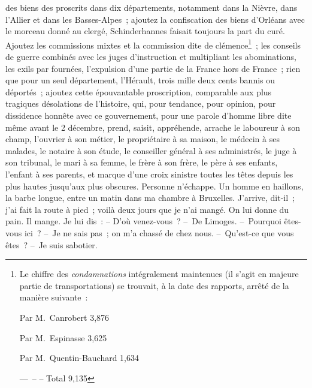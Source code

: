 \documentclass[french,twoside]{book} %
\begin{document}
{} des biens des proscrits dans dix départements, notamment dans la Nièvre, dans l’Allier et dans les Basses-Alpes ; ajoutez la confiscation des biens d’Orléans avec le morceau donné au clergé, Schinderhannes faisait toujours la part du curé. Ajoutez les commissions mixtes et la commission dite de clémence\footnote{ \noindent Le chiffre des \emph{condamnations} intégralement maintenues (il s’agit en majeure partie de transportations) se trouvait, à la date des rapports, arrêté de la manière suivante :\par
 Par M. Canrobert 3,876\par
 Par M. Espinasse 3,625\par
 Par M. Quentin-Bauchard 1,634\par
 — – – Total 9,135
} ; les conseils de guerre combinés avec les juges d’instruction et multipliant les abominations, les exils par fournées, l’expulsion d’une partie de la France hors de France ; rien que pour un seul département, l’Hérault, trois mille deux cents bannis ou déportés ; ajoutez cette épouvantable proscription, comparable aux plus tragiques désolations de l’histoire, qui, pour tendance, pour opinion, pour dissidence honnête avec ce gouvernement, pour une parole d’homme libre dite même avant le 2 décembre, prend, saisit, appréhende, arrache le laboureur à son champ, l’ouvrier à son métier, le propriétaire à sa maison, le médecin à ses malades, le notaire à son étude, le conseiller général à ses administrés, le juge à son tribunal, le mari à sa femme, le frère à son frère, le père à ses enfants, l’enfant à ses parents, et marque d’une croix sinistre toutes les têtes depuis les plus hautes jusqu’aux plus obscures. Personne n’échappe. Un homme en haillons, la barbe longue, entre un matin dans ma chambre à Bruxelles. J’arrive, dit-il ; j’ai fait la route à pied ; voilà deux jours que je n’ai mangé. On lui donne du pain. Il mange. Je lui dis : – D’où venez-vous ? – De Limoges. – Pourquoi êtes-vous ici ? – Je ne sais pas ; on m’a chassé de chez nous. – Qu’est-ce que vous êtes ? – Je suis sabotier.\par
\end{document}
